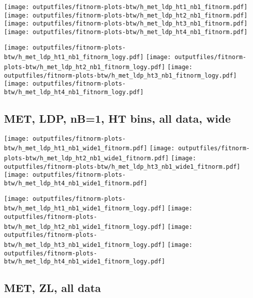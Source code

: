 \documentclass[11pt]{article}
\begin{document}
    \noindent
     \texttt{[image: outputfiles/fitnorm-plots-btw/h\_met\_ldp\_ht1\_nb1\_fitnorm.pdf]}
     \texttt{[image: outputfiles/fitnorm-plots-btw/h\_met\_ldp\_ht2\_nb1\_fitnorm.pdf]}
     \texttt{[image: outputfiles/fitnorm-plots-btw/h\_met\_ldp\_ht3\_nb1\_fitnorm.pdf]}
     \texttt{[image: outputfiles/fitnorm-plots-btw/h\_met\_ldp\_ht4\_nb1\_fitnorm.pdf]}

    \noindent
     \texttt{[image: outputfiles/fitnorm-plots-btw/h\_met\_ldp\_ht1\_nb1\_fitnorm\_logy.pdf]}
     \texttt{[image: outputfiles/fitnorm-plots-btw/h\_met\_ldp\_ht2\_nb1\_fitnorm\_logy.pdf]}
     \texttt{[image: outputfiles/fitnorm-plots-btw/h\_met\_ldp\_ht3\_nb1\_fitnorm\_logy.pdf]}
     \texttt{[image: outputfiles/fitnorm-plots-btw/h\_met\_ldp\_ht4\_nb1\_fitnorm\_logy.pdf]}


    \clearpage
     \subsection{ MET, LDP, nB=1, HT bins, all data, wide}

    \noindent
     \texttt{[image: outputfiles/fitnorm-plots-btw/h\_met\_ldp\_ht1\_nb1\_wide1\_fitnorm.pdf]}
     \texttt{[image: outputfiles/fitnorm-plots-btw/h\_met\_ldp\_ht2\_nb1\_wide1\_fitnorm.pdf]}
     \texttt{[image: outputfiles/fitnorm-plots-btw/h\_met\_ldp\_ht3\_nb1\_wide1\_fitnorm.pdf]}
     \texttt{[image: outputfiles/fitnorm-plots-btw/h\_met\_ldp\_ht4\_nb1\_wide1\_fitnorm.pdf]}

    \noindent
     \texttt{[image: outputfiles/fitnorm-plots-btw/h\_met\_ldp\_ht1\_nb1\_wide1\_fitnorm\_logy.pdf]}
     \texttt{[image: outputfiles/fitnorm-plots-btw/h\_met\_ldp\_ht2\_nb1\_wide1\_fitnorm\_logy.pdf]}
     \texttt{[image: outputfiles/fitnorm-plots-btw/h\_met\_ldp\_ht3\_nb1\_wide1\_fitnorm\_logy.pdf]}
     \texttt{[image: outputfiles/fitnorm-plots-btw/h\_met\_ldp\_ht4\_nb1\_wide1\_fitnorm\_logy.pdf]}




     \subsection{ MET, ZL, all data}
\end{document}
